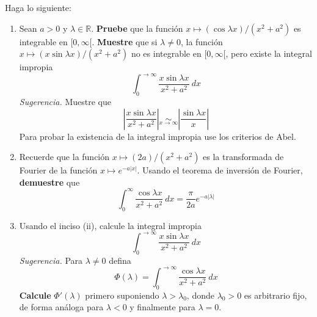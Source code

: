 \documentclass[12pt]{report}
\newcounter{it}
\theoremstyle{largebreak}
\newcommand\abs[1]{\ensuremath{\left|#1\right|}}
\begin{document}
    \begin{excer}
        Haga lo siguiente:
        \begin{enumerate}
            \item Sean $a>0$ y $\lambda\in\mathbb{R}$. \textbf{Pruebe} que la función $x\mapsto (\cos \lambda x)/(x^2+a^2)$ es integrable en $[0,\infty[$. \textbf{Muestre} que si $\lambda\neq0$, la función $x\mapsto (x\sin \lambda x)/(x^2+a^2)$ no es integrable en $[0,\infty[$, pero existe la integral impropia
            \begin{equation*}
                \int_0^{\rightarrow\infty}\frac{x\sin\lambda x}{x^2+a^2}\:dx
            \end{equation*}
            \textit{Sugerencia.} Muestre que
            \begin{equation*}
                \abs{\frac{x\sin\lambda x}{x^2+a^2}}\underset{x\rightarrow\infty}{\sim}\abs{\frac{\sin\lambda x}{x}}
            \end{equation*}
            Para probar la existencia de la integral impropia use los criterios de Abel.
            \item Recuerde que la función $x\mapsto (2a)/(x^2+a^2)$ es la transformada de Fourier de la función $x\mapsto e^{-a\abs{x}}$. Usando el teorema de inversión de Fourier, \textbf{demuestre} que
            \begin{equation*}
                \int_0^{\infty}\frac{\cos\lambda x}{x^2+a^2}\:dx=\frac{\pi}{2a}e^{ -a\abs{\lambda}}
            \end{equation*}
            \item Usando el inciso (ii), calcule la integral impropia
            \begin{equation*}
                \int_0^{\rightarrow\infty}\frac{x\sin\lambda x}{x^2+a^2}\:dx
            \end{equation*}
            \textit{Sugerencia.} Para $\lambda\neq0$ defina
            \begin{equation*}
                \Phi(\lambda)=\int_0^{\rightarrow\infty}\frac{\cos\lambda x}{x^2+a^2}\:dx
            \end{equation*}
            \textbf{Calcule} $\Phi'(\lambda)$ primero suponiendo $\lambda>\lambda_0$, donde $\lambda_0>0$ es arbitrario fijo, de forma análoga para $\lambda<0$ y finalmente para $\lambda=0$.
        \end{enumerate}
    \end{excer}
\end{document}
